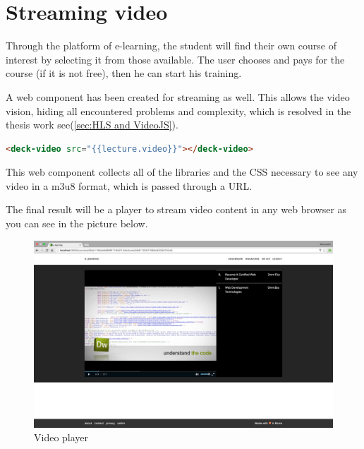 \section{Streaming video}
\label{sec:attend_the_course}

Through the platform of e-learning, the student will find their own course of interest by selecting it from those available.
The user chooses and pays for the course (if it is not free), then he can start his training.

A web component has been created for streaming as well. This allows the video vision, hiding all encountered problems and complexity, which is resolved in the thesis work see(\ref{sec:HLS and VideoJS}).

\begin{lstlisting}[language=html]
  <deck-video src="{{lecture.video}}"></deck-video>
\end{lstlisting}
This web component collects all of the libraries and the CSS necessary to see any video in a m3u8 format, which is passed through a URL.

The final result will be a player to stream video content in any web browser as you can see in the picture below.

\begin{figure}[htb]
 \centering
 \includegraphics[width=1.0\linewidth]{images/chapter5/page-lecture-deck.png}\hfill
 \caption[Video player]{Video player}
 \label{fig:fourV}
\end{figure}
